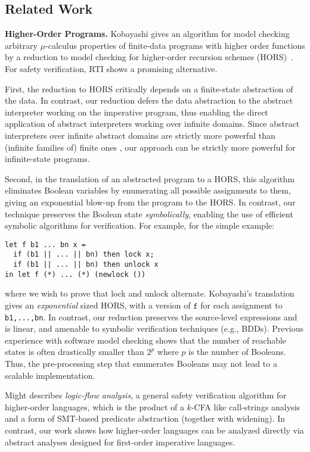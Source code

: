 \documentclass[nocopyrightspace]{sigplanconf}
\def\mypara#1{\smallskip\noindent\textbf{#1}}
\newcommand\HMC{\textsc{RTI}\xspace}
\newcommand{\ttf}{\mathtt{f}}
\begin{document}
\subsection{Related Work}

\mypara{Higher-Order Programs.}
Kobayashi \cite{KobayashiPOPL09,KobayashiLICS09} gives an algorithm
for model checking arbitrary $\mu$-calculus properties of finite-data
programs with higher order functions by a reduction to model checking
for higher-order recursion schemes (HORS)~\cite{Ong}.
For safety verification, \HMC shows a promising alternative.

First, the reduction to HORS critically depends on a finite-state abstraction of the data.
In contrast, our reduction defers the data abstraction to the abstract interpreter working
on the imperative program, thus enabling the direct application of abstract interpreters working
over infinite domains. 
Since abstract interpreters over infinite abstract domains are strictly 
more powerful than (infinite families of) finite ones \cite{CousotCousot92comparison}, 
our approach can be strictly more powerful for infinite-state programs.


Second, in the translation of an abstracted program to a HORS,
this algorithm eliminates Boolean variables by enumerating 
all possible assignments to them, giving an exponential
blow-up from the program to the HORS. 
In contrast, our technique preserves the Boolean state \emph{symbolically}, 
enabling the use of efficient symbolic algorithms for verification.
For example, for the simple example:
\begin{verbatim}
let f b1 ... bn x = 
  if (b1 || ... || bn) then lock x;
  if (b1 || ... || bn) then unlock x 
in let f (*) ... (*) (newlock ()) 
\end{verbatim}
where we wish to prove that lock and unlock alternate. 
Kobayashi's translation \cite{KobayashiPOPL09} gives an {\em exponential} sized HORS,
with a version of $\ttf$ for each assignment to \verb+b1,...,bn+.
In contrast, our reduction preserves the source-level expressions and is linear, 
and amenable to symbolic verification techniques (e.g., BDDs).
Previous experience with software model checking \cite{SLAMPOPL02,HJMM04,fsoft06} 
shows that the number of reachable states is often drastically 
smaller than $2^p$ where $p$ is the number of Booleans.  
Thus, the pre-processing step that enumerates Booleans 
may not lead to a scalable implementation.

Might \cite{Might07} describes {\em logic-flow analysis}, a general safety verification 
algorithm for higher-order languages, which is the product 
of a $k$-CFA like call-strings analysis and a form of SMT-based
predicate abstraction (together with widening).
In contrast, our work shows how higher-order
languages can be analyzed directly via 
abstract analyses designed for first-order imperative languages.
\end{document}
